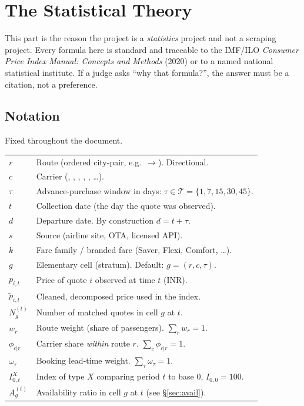\chapter{The Statistical Theory}

This part is the reason the project is a \emph{statistics} project and not a scraping
project. Every formula here is standard and traceable to the IMF/ILO \emph{Consumer Price
Index Manual: Concepts and Methods} (2020) or to a named national statistical institute.
If a judge asks ``why that formula?'', the answer must be a citation, not a preference.

\section{Notation}

Fixed throughout the document.

\begin{center}
\small
\begin{tabularx}{\textwidth}{@{}L{2.4cm} X@{}}
\toprule
{} &  \\
\midrule
$r$ & Route (ordered city-pair, e.g.\ $\to$). Directional. \\
$c$ & Carrier (, , , , , \dots). \\
$\tau$ & Advance-purchase window in days: $\tau \in \mathcal{T} = \{1,7,15,30,45\}$. \\
$t$ & Collection date (the day the quote was observed). \\
$d$ & Departure date. By construction $d = t + \tau$. \\
$s$ & Source (airline site, OTA, licensed API). \\
$k$ & Fare family / branded fare (Saver, Flexi, Comfort, \dots). \\
$g$ & Elementary cell (stratum). Default: $g = (r,c,\tau)$. \\
$p_{i,t}$ & Price of quote $i$ observed at time $t$ (INR). \\
$\tilde p_{i,t}$ & Cleaned, decomposed price used in the index. \\
$N_g^{(t)}$ & Number of matched quotes in cell $g$ at $t$. \\
$w_r$ & Route weight (share of passengers). $\sum_r w_r = 1$. \\
$\phi_{c|r}$ & Carrier share \emph{within} route $r$. $\sum_c \phi_{c|r} = 1$. \\
$\omega_\tau$ & Booking lead-time weight. $\sum_\tau \omega_\tau = 1$. \\
$I^{X}_{0,t}$ & Index of type $X$ comparing period $t$ to base $0$, $I_{0,0}=100$. \\
$A_g^{(t)}$ & Availability ratio in cell $g$ at $t$ (see \S\ref{sec:avail}). \\
\bottomrule
\end{tabularx}
\end{center}

